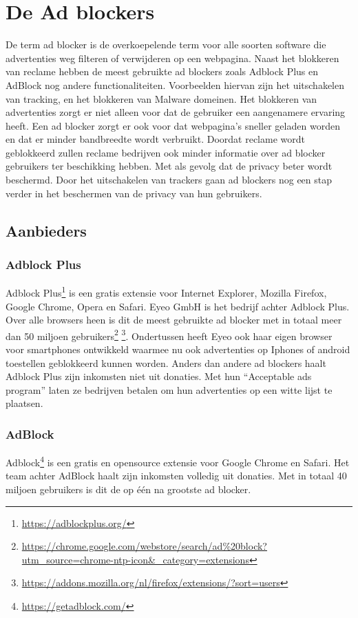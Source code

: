 \documentclass[pdftex,a4paper,12pt,twoside]{report}
\begin{document}
\chapter{De Ad blockers}
\label{ch:De Ad blockers}
De term ad blocker is de overkoepelende term voor alle soorten software die advertenties weg filteren of verwijderen op een webpagina. Naast het blokkeren van reclame hebben de meest gebruikte ad blockers zoals Adblock Plus en AdBlock nog andere functionaliteiten. Voorbeelden hiervan zijn het uitschakelen van tracking, en het blokkeren van Malware domeinen. Het blokkeren van advertenties zorgt er niet alleen voor dat de gebruiker een aangenamere ervaring heeft. Een ad blocker zorgt er ook voor dat webpagina’s sneller geladen worden en dat er minder bandbreedte wordt verbruikt. Doordat reclame wordt geblokkeerd zullen reclame bedrijven ook minder informatie over ad blocker gebruikers ter beschikking hebben. Met als gevolg dat de privacy beter wordt beschermd. Door het uitschakelen van trackers gaan ad blockers nog een stap verder in het beschermen van de privacy van hun gebruikers.
\section{Aanbieders}
\label{sec:Aanbieders}
\subsection{Adblock Plus}
\label{sec:Adblock Plus}
Adblock Plus\footnote{\url{https://adblockplus.org/}} is een gratis extensie voor Internet Explorer, Mozilla Firefox, Google Chrome, Opera en Safari. Eyeo GmbH is het bedrijf achter Adblock Plus. Over alle browsers heen is dit de meest gebruikte ad blocker met in totaal meer dan 50 miljoen gebruikers\footnote{\url{https://chrome.google.com/webstore/search/ad\%20block?utm_source=chrome-ntp-icon&_category=extensions}} \footnote{\url{https://addons.mozilla.org/nl/firefox/extensions/?sort=users}}. Ondertussen heeft Eyeo ook haar eigen browser voor smartphones ontwikkeld waarmee nu ook advertenties op Iphones of android toestellen geblokkeerd kunnen worden. Anders dan andere ad blockers haalt Adblock Plus zijn inkomsten niet uit donaties. Met hun "`Acceptable ads program"' laten ze bedrijven betalen om hun advertenties op een witte lijst te plaatsen.
\subsection{AdBlock}
\label{sec:AdBlock}
Adblock\footnote{\url{https://getadblock.com/}} is een gratis en opensource extensie voor Google Chrome en Safari. Het team achter AdBlock haalt zijn inkomsten volledig uit donaties. Met in totaal 40 miljoen gebruikers is dit de op één na grootste ad blocker.
\end{document}
